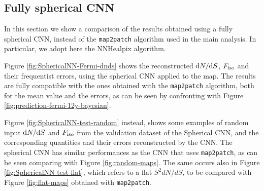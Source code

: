 \subsection{Fully spherical CNN}
\label{sec:full-spherical-nn}

In this section we show a comparison of the results obtained using a fully spherical CNN, instead of the \verb|map2patch| algorithm used in the main analysis. In particular, we adopt here the NNHealpix \cite{Krachmalnicoff:2019} algorithm.

Figure \ref{fig:SphericalNN-Fermi-dnds} shows the reconstructed $\text{d}N/\text{d}S$, $F_{\text{iso}}$  and their frequentist errors, using the spherical CNN applied to the \fermi map. The results are fully compatible with the ones obtained with the \verb|map2patch| algorithm, both for the mean value and the errors, as can be seen by confronting with Figure \ref{fig:prediction-fermi-12y-bayesian}.


Figure \ref{fig:SphericalNN-test-random} instead, shows some examples of random input $\text{d}N/\text{d}S$ and $F_{\text{iso}}$ from the validation dataset of the Spherical CNN, and the corresponding quantities and their errors reconstructed by the CNN.
The spherical CNN has similar performances as the  CNN that uses \verb|map2patch|, as can be seen comparing with Figure \ref{fig:random-maps}. The same occurs also in Figure \ref{fig:SphericalNN-test-flat}, which refers to a flat $S^2 dN/dS$, to be compared with Figure \ref{fig:flat-maps} obtained with \verb|map2patch|.






